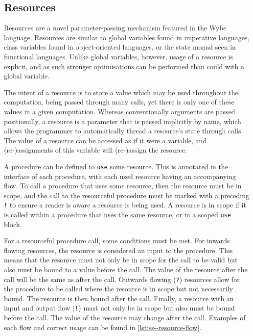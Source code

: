 \subsection{Resources}
\label{ssec:intro-resources}

Resources are a novel parameter-passing mechanism featured in the Wybe language. Resources are similar to global variables found in imperative languages, class variables found in object-oriented languages, or the state monad seen in functional languages. Unlike global variables, however, usage of a resource is explicit, and as such stronger optimisations can be performed than could with a global variable.

The intent of a resource is to store a value which may be used throughout the computation, being passed through many calls, yet there is only one of these values in a given computation. Whereas conventionally arguments are passed positionally, a resource is a parameter that is passed implicitly by name, which allows the programmer to automatically thread a resource's state through calls. The value of a resource can be accessed as if it were a variable, and (re-)assignments of this variable will (re-)assign the resource.

A procedure can be defined to \texttt{use} some resource. This is annotated in the interface of each procedure, with each used resource having an accompanying flow. To call a procedure that uses some resource, then the resource must be in scope, and the call to the resourceful procedure must be marked with a preceding \texttt{!} to ensure a reader is aware a resource is being used. A resource is in scope if it is called within a procedure that uses the same resource, or in a scoped \texttt{use} block. 

For a resourceful procedure call, some conditions must be met. For inwards flowing resources, the resource is considered an input to the procedure. This means that the resource must not only be in scope for the call to be valid but also must be bound to a value before the call. The value of the resource after the call will be the same as after the call. Outwards flowing (\texttt{?}) resources allow for the procedure to be called where the resource is in scope but not necessarily bound. The resource is then bound after the call. Finally, a resource with an input and output flow (\texttt{!}) must not only be in scope but also must be bound before the call. The value of the resource may change after the call. Examples of each flow and correct usage can be found in \cref{lst:ss--resource-flow}. 


